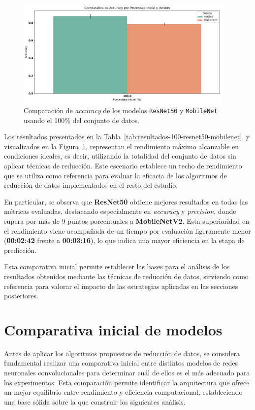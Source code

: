 \begin{figure}[htp]
  \centering
  \includegraphics[width=0.95\textwidth]{imagenes/evaluaciones/comparacion_modelos_100.png}
  \caption{Comparación de \textit{accuracy} de los modelos \texttt{ResNet50} y \texttt{MobileNet} usando el 100\% del conjunto de datos.}
  \label{fig:comparacion_modelos_100}
\end{figure}

Los resultados presentados en la Tabla~\ref{tab:resultados-100-resnet50-mobilenet}, y visualizados en la Figura~\ref{fig:comparacion_modelos_100},
representan el rendimiento máximo alcanzable en condiciones ideales,
es decir, utilizando la totalidad del conjunto de datos sin aplicar técnicas de reducción.
Este escenario establece un techo de rendimiento que se utiliza como referencia para evaluar la eficacia de
los algoritmos de reducción de datos implementados en el resto del estudio.

En particular, se observa que \textbf{ResNet50} obtiene mejores resultados en todas las métricas evaluadas,
destacando especialmente en \textit{accuracy} y \textit{precision}, donde supera por más de 9 puntos porcentuales a \textbf{MobileNetV2}.
Esta superioridad en el rendimiento viene acompañada de un tiempo por evaluación ligeramente menor (\textbf{00:02:42} frente a \textbf{00:03:16}),
lo que indica una mayor eficiencia en la etapa de predicción.

Esta comparativa inicial permite establecer las bases para el análisis de los resultados obtenidos mediante las técnicas de reducción de datos,
sirviendo como referencia para valorar el impacto de las estrategias aplicadas en las secciones posteriores.


\section{Comparativa inicial de modelos}\label{sec:comparativa-inicial-modelos}
Antes de aplicar los algoritmos propuestos de reducción de datos, se considera fundamental realizar una comparativa inicial entre distintos
modelos de redes neuronales convolucionales para determinar cuál de ellos es el más adecuado para los experimentos.
Esta comparación permite identificar la arquitectura que ofrece un mejor equilibrio entre rendimiento y eficiencia computacional,
estableciendo una base sólida sobre la que construir los siguientes análisis.

